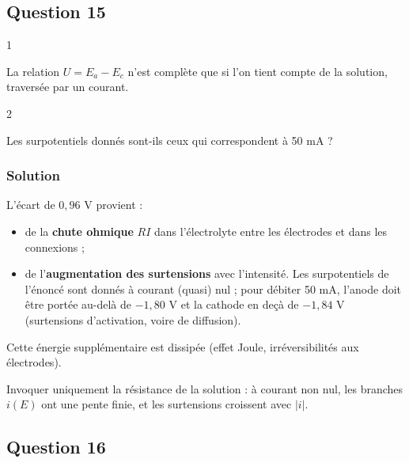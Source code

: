 \documentclass[11pt,a4paper]{article}
\providecommand{\tightlist}{\setlength{\itemsep}{0pt}\setlength{\parskip}{0pt}}
\begin{document}
\hypertarget{question-15}{%
\subsection{Question 15}\label{question-15}}

\begin{indication}{1}

La relation \(U=E_a-E_c\) n'est complète que si l'on tient compte de la solution, traversée par un courant.

\end{indication}

\begin{indication}{2}

Les surpotentiels donnés sont-ils ceux qui correspondent à 50 mA ?

\end{indication}

\hypertarget{solution-14}{%
\subsubsection{Solution}\label{solution-14}}

L'écart de \(0{,}96\) V provient :

\begin{itemize}
\tightlist
\item
  de la \textbf{chute ohmique} \(RI\) dans l'électrolyte entre les électrodes et dans les connexions ;
\item
  de l'\textbf{augmentation des surtensions} avec l'intensité. Les surpotentiels de l'énoncé sont donnés à courant (quasi) nul ; pour débiter 50 mA, l'anode doit être portée au-delà de \(-1{,}80\) V et la cathode en deçà de \(-1{,}84\) V (surtensions d'activation, voire de diffusion).
\end{itemize}

Cette énergie supplémentaire est dissipée (effet Joule, irréversibilités aux électrodes).

\begin{piege}

Invoquer uniquement la résistance de la solution : à courant non nul, les branches \(i(E)\) ont une pente finie, et les surtensions croissent avec \(|i|\).

\end{piege}

\hypertarget{question-16}{%
\subsection{Question 16}\label{question-16}}
\end{document}
